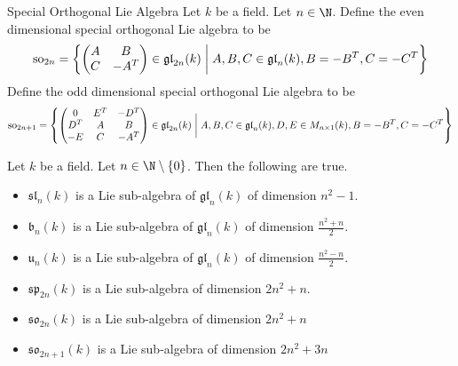 \documentclass[a4paper]{article}
\begin{document}
\begin{defn}{Special Orthogonal Lie Algebra}{} Let $k$ be a field. Let $n\in\N$. Define the even dimensional special orthogonal Lie algebra to be $$\text{so}_{2n}=\left\{
\begin{pmatrix}
A & B\\
C & -A^T
\end{pmatrix}\in\mathfrak{gl}_{2n}(k)\;\bigg{|}\;A,B,C\in\mathfrak{gl}_n(k), B=-B^T, C=-C^T\right\}$$ Define the odd dimensional special orthogonal Lie algebra to be $$\text{so}_{2n+1}=\left\{
\begin{pmatrix}
0 & E^T & -D^T\\
D^T & A & B\\
-E & C & -A^T
\end{pmatrix}\in\mathfrak{gl}_{2n}(k)\;\bigg{|}\;A,B,C\in\mathfrak{gl}_n(k), D,E\in M_{n\times 1}(k), B=-B^T, C=-C^T\right\}$$
\end{defn}

\begin{prp}{}{} Let $k$ be a field. Let $n\in\N\setminus\{0\}$. Then the following are true. 
\begin{itemize}
\item $\mathfrak{sl}_n(k)$ is a Lie sub-algebra of $\mathfrak{gl}_n(k)$ of dimension $n^2-1$. 
\item $\mathfrak{b}_n(k)$ is a Lie sub-algebra of $\mathfrak{gl}_n(k)$ of dimension $\frac{n^2+n}{2}$. 
\item $\mathfrak{u}_n(k)$ is a Lie sub-algebra of $\mathfrak{gl}_n(k)$ of dimension $\frac{n^2-n}{2}$. 
\item $\mathfrak{sp}_{2n}(k)$ is a Lie sub-algebra of dimension $2n^2+n$. 
\item $\mathfrak{so}_{2n}(k)$ is a Lie sub-algebra of dimension $2n^2+n$
\item $\mathfrak{so}_{2n+1}(k)$ is a Lie sub-algebra of dimension $2n^2+3n$
\end{itemize}
\end{prp}
\end{document}
